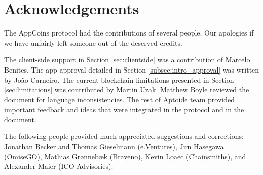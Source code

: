 \section{Acknowledgements}
\label{sec:acknowledgements}

The AppCoins protocol had the contributions of several people. Our apologies if we have unfairly left someone out of the deserved credits.

\medskip

The client-side support in Section \ref{sec:clientside} was a contribution of Marcelo Benites. The app approval detailed in Section \ref{subsec:intro_approval} was written by Jo\~ao Carneiro. The current blockchain limitations presented in Section \ref{sec:limitations} was contributed by Martin Uzak. Matthew Boyle reviewed the document for language inconsistencies. The rest of Aptoide team provided important feedback and ideas that were integrated in the protocol and in the document.

\medskip

The following people provided much appreciated suggestions and corrections: Jonathan Becker and Thomas Gieselmann (e.Ventures), Jun Hasegawa (OmiseGO), Mathias Gr{\o}nneb{\ae}k (Braveno), Kevin Loaec (Chainsmiths), and Alexander Maier (ICO Advisories).

